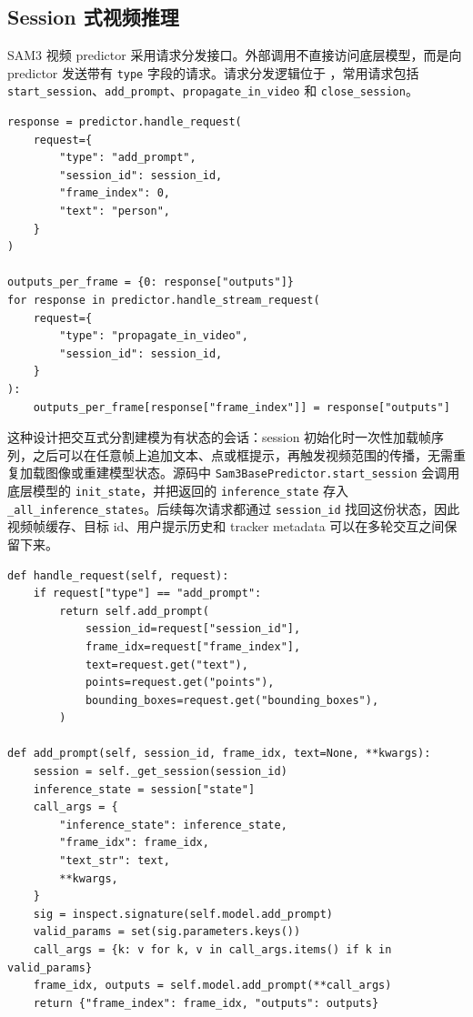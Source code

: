 \documentclass[UTF8,a4paper,zihao=-4,fontset=none]{ctexart}
\newcommand{\codepath}[1]{\path{#1}}
\begin{document}
\subsection{Session 式视频推理}

SAM3 视频 predictor 采用请求分发接口。外部调用不直接访问底层模型，而是向 predictor 发送带有 \texttt{type} 字段的请求。请求分发逻辑位于 \codepath{sam3/model/sam3_base_predictor.py}，常用请求包括 \texttt{start\_session}、\texttt{add\_prompt}、\texttt{propagate\_in\_video} 和 \texttt{close\_session}。

\begin{lstlisting}[style=pythoncode,caption={文本提示和跨帧传播的核心调用}]
response = predictor.handle_request(
    request={
        "type": "add_prompt",
        "session_id": session_id,
        "frame_index": 0,
        "text": "person",
    }
)

outputs_per_frame = {0: response["outputs"]}
for response in predictor.handle_stream_request(
    request={
        "type": "propagate_in_video",
        "session_id": session_id,
    }
):
    outputs_per_frame[response["frame_index"]] = response["outputs"]
\end{lstlisting}

这种设计把交互式分割建模为有状态的会话：session 初始化时一次性加载帧序列，之后可以在任意帧上追加文本、点或框提示，再触发视频范围的传播，无需重复加载图像或重建模型状态。源码中 \texttt{Sam3BasePredictor.start\_session} 会调用底层模型的 \texttt{init\_state}，并把返回的 \texttt{inference\_state} 存入 \texttt{\_all\_inference\_states}。后续每次请求都通过 \texttt{session\_id} 找回这份状态，因此视频帧缓存、目标 id、用户提示历史和 tracker metadata 可以在多轮交互之间保留下来。

\begin{lstlisting}[style=pythoncode,caption={请求分发与参数过滤的源码逻辑摘录}]
def handle_request(self, request):
    if request["type"] == "add_prompt":
        return self.add_prompt(
            session_id=request["session_id"],
            frame_idx=request["frame_index"],
            text=request.get("text"),
            points=request.get("points"),
            bounding_boxes=request.get("bounding_boxes"),
        )

def add_prompt(self, session_id, frame_idx, text=None, **kwargs):
    session = self._get_session(session_id)
    inference_state = session["state"]
    call_args = {
        "inference_state": inference_state,
        "frame_idx": frame_idx,
        "text_str": text,
        **kwargs,
    }
    sig = inspect.signature(self.model.add_prompt)
    valid_params = set(sig.parameters.keys())
    call_args = {k: v for k, v in call_args.items() if k in valid_params}
    frame_idx, outputs = self.model.add_prompt(**call_args)
    return {"frame_index": frame_idx, "outputs": outputs}
\end{lstlisting}
\end{document}
